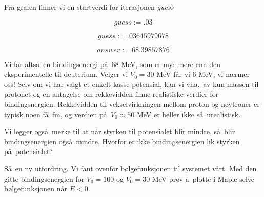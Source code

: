 \documentclass{article}
\begin{document}
\begin{maplegroup}
\begin{mapleinput}
\end{mapleinput}
\end{maplegroup}
Fra grafen finner vi en startverdi for iterasjonen {\it guess}
\begin{maplegroup}
\begin{mapleinput}
\end{mapleinput}

\mapleresult
\begin{maplelatex}
\[
\mathit{guess} := .03
\]
\end{maplelatex}

\end{maplegroup}
\begin{maplegroup}
\begin{mapleinput}
\end{mapleinput}

\mapleresult
\begin{maplelatex}
\[
\mathit{guess} := .03645979678
\]
\end{maplelatex}

\end{maplegroup}
\begin{maplegroup}
\begin{mapleinput}
\end{mapleinput}

\mapleresult
\begin{maplelatex}
\[
\mathit{answer} := 68.39857876
\]
\end{maplelatex}

\end{maplegroup}
\begin{maplegroup}
\begin{mapleinput}
\end{mapleinput}

\end{maplegroup}
Vi f\aa r alts\aa\ en bindingsenergi p\aa\ $68$ MeV, som er mye
mere enn den eksperimentelle til deuterium.
Velger vi $V_0=30$ MeV f\aa r vi $6$ MeV, vi n\ae rmer oss!
Selv om vi har valgt et enkelt kasse potensial, kan vi vha.\
av kun massen til protonet og en antagelse om rekkevidden
finne realistiske verdier for bindingsnergien.
Rekkevidden til vekselvirkningen mellom proton og n\o ytroner 
er typisk noen f\aa\ fm, og verdien p\aa\ $V_0 \approx 50 $ MeV
er heller ikke s\aa\ urealistisk.

Vi legger ogs\aa\ merke til at n\aa r styrken til potensialet blir 
mindre, s\aa\ blir bindingsenergien ogs\aa\ mindre.
Hvorfor er ikke bindingsenergien lik styrken p\aa\ potensialet?

S\aa\ en ny utfordring. Vi fant ovenfor b\o lgefunksjonen til systemet
v\aa rt. Med den gitte bindingsenergien for $V_0=100$ og $V_0=30$ MeV
pr\o v \aa\ plotte i Maple selve b\o lgefunksjonen n\aa r $E<0$.


\end{document}
